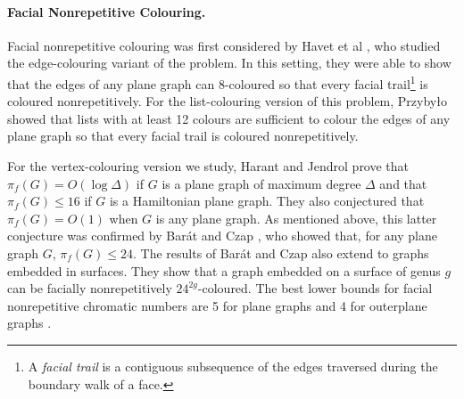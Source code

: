 \documentclass{patmorin}
\begin{document}
\paragraph{Facial Nonrepetitive Colouring.}

Facial nonrepetitive colouring was first considered by Havet et
al \cite{havet2011facial}, who studied the edge-colouring variant
of the problem.  In this setting, they were able to show that
the edges of any plane graph can 8-coloured so that every facial
trail\footnote{A \emph{facial trail} is a contiguous subsequence of the
edges traversed during the boundary walk of a face.} is coloured
nonrepetitively.  For the list-colouring version of this problem,
Przyby{\l}o \cite{przybylo2013facial} showed that lists with at least
12 colours are sufficient to colour the edges of any plane graph so that
every facial trail is coloured nonrepetitively.

For the vertex-colouring version we study, Harant and Jendrol
\cite{harant2012nonrepetitive} prove that $\pi_f(G)=O(\log\Delta)$ if
$G$ is a plane graph of maximum degree $\Delta$ and that $\pi_f(G)\le
16$ if $G$ is a Hamiltonian plane graph.  They also conjectured that
$\pi_f(G)=O(1)$ when $G$ is any plane graph.  As mentioned above, this
latter conjecture was confirmed by Barát and Czap \cite{barat2013facial},
who showed that, for any plane graph $G$, $\pi_f(G)\le 24$.  The results
of Barát and Czap \cite{barat2013facial} also extend to graphs embedded
in surfaces.  They show that a graph embedded on a surface of genus $g$
can be facially nonrepetitively $24^{2g}$-coloured.  The best lower
bounds for facial nonrepetitive chromatic numbers are 5 for plane graphs
and 4 for outerplane graphs \cite{barat2013facial}.


%
 
\end{document}
